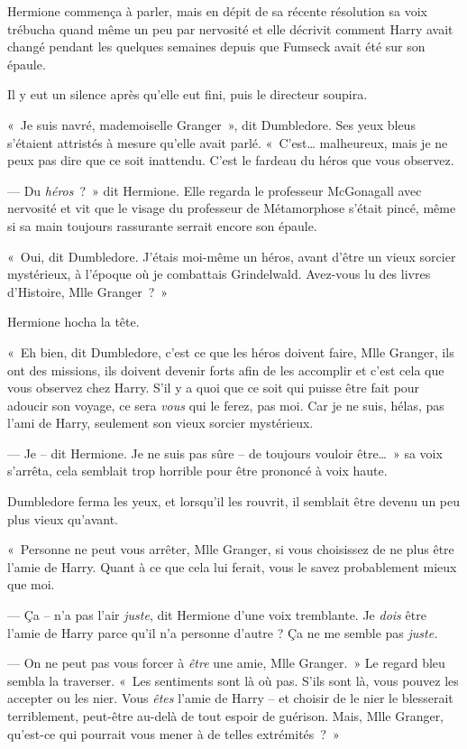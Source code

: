 Hermione commença à parler, mais en dépit de sa récente résolution sa voix trébucha quand même un peu par nervosité et elle décrivit comment Harry avait changé pendant les quelques semaines depuis que Fumseck avait été sur son épaule.

Il y eut un silence après qu'elle eut fini, puis le directeur soupira.

«~Je suis navré, mademoiselle Granger~», dit Dumbledore. Ses yeux bleus s'étaient attristés à mesure qu'elle avait parlé. «~C'est… malheureux, mais je ne peux pas dire que ce soit inattendu. C'est le fardeau du héros que vous observez.

--- Du \emph{héros}~?~» dit Hermione. Elle regarda le professeur McGonagall avec nervosité et vit que le visage du professeur de Métamorphose s'était pincé, même si sa main toujours rassurante serrait encore son épaule.

«~Oui, dit Dumbledore. J'étais moi-même un héros, avant d'être un vieux sorcier mystérieux, à l'époque où je combattais Grindelwald. Avez-vous lu des livres d'Histoire, Mlle Granger~?~»

Hermione hocha la tête.

«~Eh bien, dit Dumbledore, c'est ce que les héros doivent faire, Mlle Granger, ils ont des missions, ils doivent devenir forts afin de les accomplir et c'est cela que vous observez chez Harry. S'il y a quoi que ce soit qui puisse être fait pour adoucir son voyage, ce sera \emph{vous} qui le ferez, pas moi. Car je ne suis, hélas, pas l'ami de Harry, seulement son vieux sorcier mystérieux.

--- Je -- dit Hermione. Je ne suis pas sûre -- de toujours vouloir être…~» sa voix s'arrêta, cela semblait trop horrible pour être prononcé à voix haute.

Dumbledore ferma les yeux, et lorsqu'il les rouvrit, il semblait être devenu un peu plus vieux qu'avant.

«~Personne ne peut vous arrêter, Mlle Granger, si vous choisissez de ne plus être l'amie de Harry. Quant à ce que cela lui ferait, vous le savez probablement mieux que moi.

--- Ça -- n'a pas l'air \emph{juste}, dit Hermione d'une voix tremblante. Je \emph{dois} être l'amie de Harry parce qu'il n'a personne d'autre ? Ça ne me semble pas \emph{juste.}

--- On ne peut pas vous forcer à \emph{être} une amie, Mlle Granger.~» Le regard bleu sembla la traverser. «~Les sentiments sont là où pas. S'ils sont là, vous pouvez les accepter ou les nier. Vous \emph{êtes} l'amie de Harry -- et choisir de le nier le blesserait terriblement, peut-être au-delà de tout espoir de guérison. Mais, Mlle Granger, qu'est-ce qui pourrait vous mener à de telles extrémités~?~»

